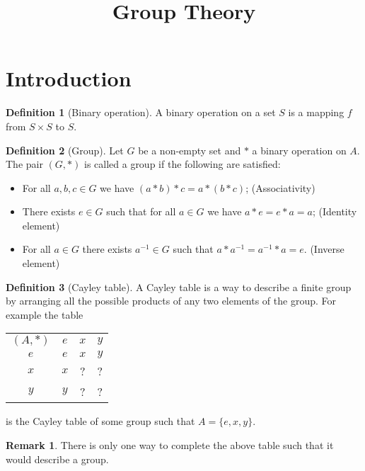 \documentclass[11pt,a4paper]{article}
\title{\textbf{Group Theory}}
\author{}
\date{}
\theoremstyle{definition}
\newtheorem{definition}{Definition}[section]
\newtheorem{remark}{Remark}[section]
\theoremstyle{plain}
\begin{document}
	\maketitle
	\newpage
  \section{Introduction}
  \begin{definition}[Binary operation]
    A binary operation on a set $S$ is a mapping $f$ from $S \times S$
    to $S$.
  \end{definition}

  \begin{definition}[Group]
    Let $G$ be a non-empty set and $*$ a binary operation on $A$.
    The pair $(G,*)$ is called a group if the following are satisfied:
	  \begin{itemize}
      \item For all $a,b,c \in G$ we have $(a * b) * c = a * (b * c)$;
        (Associativity)
      \item There exists $e \in G$ such that for all $a \in G$ we have
        $a * e = e * a = a$; (Identity element)
      \item For all $a \in G$ there exists $a^{-1} \in G$ such that
        $a * a^{-1} = a^{-1} * a = e$. (Inverse element)
	  \end{itemize}
  \end{definition}

  \begin{definition}[Cayley table]
    A Cayley table is a way to describe a finite group by arranging all
    the possible products of any two elements of the group. For example
    the table
    \begin{center}
    \begin{tabular}{c | c c c}
      $(A,*)$ & $e$ & $x$ & $y$ \\
      \cline{1-4}
      $e$ & $e$ & $x$ & $y$ \\
      $x$ & $x$ & ? & ? \\
      $y$ & $y$ & ? & ? 
    \end{tabular}
    \end{center}
    is the Cayley table of some group such that $A = \{e,x,y\}$.
  \end{definition}
  \begin{remark}
    There is only one way to complete the above table such that it would
    describe a group.
  \end{remark}
\end{document}
